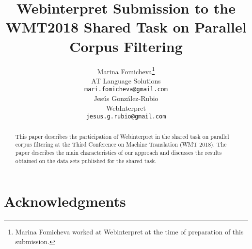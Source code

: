 \documentclass[11pt,a4paper]{article}
\title{Webinterpret Submission to the\\WMT2018 Shared Task on Parallel Corpus Filtering}
\author{Marina Fomicheva\thanks{Marina Fomicheva worked at Webinterpret at the time of preparation of this submission.} \\
  AT Language Solutions \\
  {\tt mari.fomicheva@gmail.com} \\\And
  Jes\'us Gonz\'alez-Rubio \\
  WebInterpret\\
  {\tt jesus.g.rubio@gmail.com} \\}
\date{}
\begin{document}
\maketitle
\begin{abstract}
  This paper describes the participation of Webinterpret in the shared task on parallel corpus filtering at the Third Conference on Machine Translation (WMT 2018). The paper describes the main characteristics of our approach and discusses the results obtained on the data sets published for the shared task.
\end{abstract}








\section*{Acknowledgments}





\end{document}
